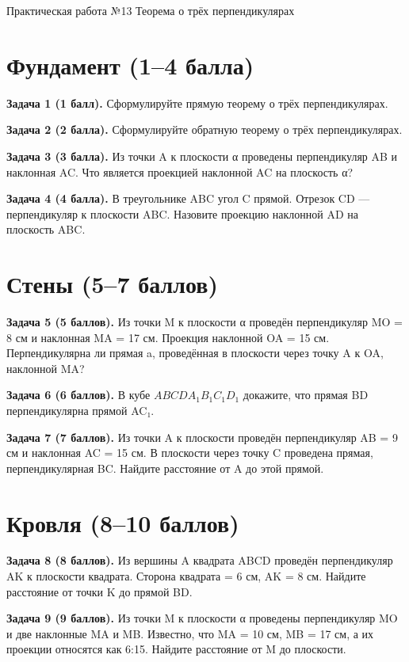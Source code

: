 \documentclass{umk-matematika}
\begin{document}
\maketitlepage
    {Практическая работа №13}
    {Теорема о трёх перпендикулярах}
    {}

\section{Фундамент (1--4 балла)}

\textbf{Задача 1 (1 балл).} Сформулируйте прямую теорему о трёх перпендикулярах.

\textbf{Задача 2 (2 балла).} Сформулируйте обратную теорему о трёх перпендикулярах.

\textbf{Задача 3 (3 балла).} Из точки A к плоскости α проведены перпендикуляр AB и наклонная AC. Что является проекцией наклонной AC на плоскость α?

\textbf{Задача 4 (4 балла).} В треугольнике ABC угол C прямой. Отрезок CD — перпендикуляр к плоскости ABC. Назовите проекцию наклонной AD на плоскость ABC.

\section{Стены (5--7 баллов)}

\textbf{Задача 5 (5 баллов).} Из точки M к плоскости α проведён перпендикуляр MO = 8 см и наклонная MA = 17 см. Проекция наклонной OA = 15 см. Перпендикулярна ли прямая a, проведённая в плоскости через точку A к OA, наклонной MA?

\textbf{Задача 6 (6 баллов).} В кубе $ABCDA_1B_1C_1D_1$ докажите, что прямая BD перпендикулярна прямой AC₁.

\textbf{Задача 7 (7 баллов).} Из точки A к плоскости проведён перпендикуляр AB = 9 см и наклонная AC = 15 см. В плоскости через точку C проведена прямая, перпендикулярная BC. Найдите расстояние от A до этой прямой.

\section{Кровля (8--10 баллов)}

\textbf{Задача 8 (8 баллов).} Из вершины A квадрата ABCD проведён перпендикуляр AK к плоскости квадрата. Сторона квадрата = 6 см, AK = 8 см. Найдите расстояние от точки K до прямой BD.

\textbf{Задача 9 (9 баллов).} Из точки M к плоскости α проведены перпендикуляр MO и две наклонные MA и MB. Известно, что MA = 10 см, MB = 17 см, а их проекции относятся как 6:15. Найдите расстояние от M до плоскости.
\end{document}
